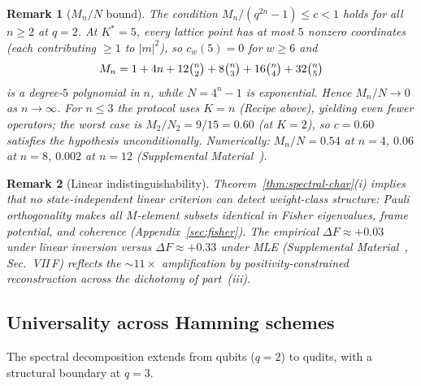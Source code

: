 \documentclass[twocolumn,prx,aps,superscriptaddress,longbibliography,floatfix]{revtex4-2}
\newtheorem*{remark}{Remark}
\begin{document}
\begin{remark}[$M_n/N$ bound]
The condition $M_n/(q^{2n}{-}1) \le c < 1$ holds for all $n \ge 2$
at $q = 2$.  At $K^* = 5$, every lattice point has at most $5$
nonzero coordinates (each contributing $\ge 1$ to $|m|^2$),
so $c_w(5) = 0$ for $w \ge 6$ and
\begin{equation*}
  M_n = 1 + 4n + 12\tbinom{n}{2} + 8\tbinom{n}{3}
        + 16\tbinom{n}{4} + 32\tbinom{n}{5}
\end{equation*}
is a degree-$5$ polynomial in $n$, while $N = 4^n - 1$ is
exponential.  Hence $M_n/N \to 0$ as $n \to \infty$.
For $n \le 3$ the protocol uses $K = n$ (Recipe above),
yielding even fewer operators; the worst case is
$M_2/N_2 = 9/15 = 0.60$ (at $K = 2$), so
$c = 0.60$ satisfies the hypothesis unconditionally.
Numerically: $M_n/N = 0.54$ at $n = 4$,
$0.06$ at $n = 8$, $0.002$ at $n = 12$
(Supplemental Material~\cite{supplemental}).
\end{remark}

\begin{remark}[Linear indistinguishability]
Theorem~\ref{thm:spectral-char}(i) implies that no
state-independent linear criterion can detect weight-class
structure: Pauli orthogonality makes all $M$-element
subsets identical in Fisher eigenvalues, frame potential,
and coherence
(Appendix~\ref{sec:fisher}).
The empirical $\Delta F \approx +0.03$ under linear
inversion versus $\Delta F \approx +0.33$ under MLE
(Supplemental Material~\cite{supplemental}, Sec.~VII\,F) reflects
the ${\sim}11\times$ amplification by positivity-constrained
reconstruction across the dichotomy of
part~(iii).
\end{remark}

\subsection{Universality across Hamming schemes}
\label{sec:universality}

The spectral decomposition extends from qubits ($q = 2$) to
qudits, with a structural boundary at $q = 3$.
\end{document}
